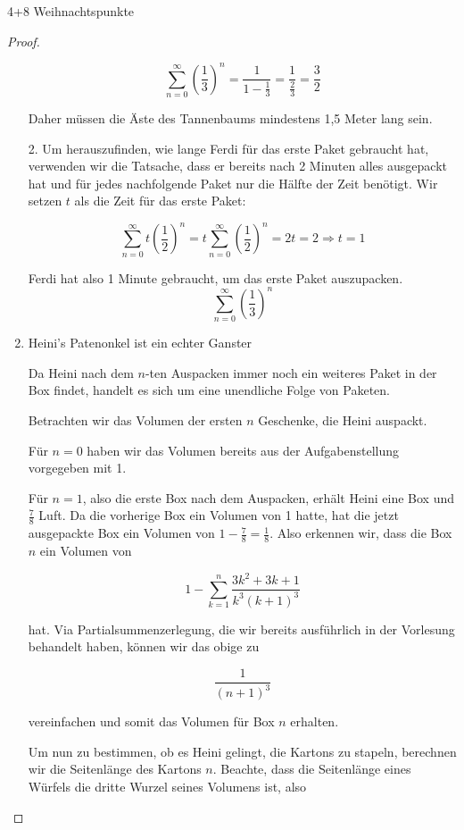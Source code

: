 \documentclass{../problemset}
\begin{document}
\begin{problem}[Weihnachtsaufgaben*]{4+8 Weihnachtspunkte}
\begin{proof}
\begin{enumerate}
		      \[
			      \sum_{n=0}^{\infty} {\left(\frac{1}{3}\right)}^n = \frac{1}{1 - \frac{1}{3}} = \frac{1}{\frac{2}{3}} = \frac{3}{2}
		      \]

		      Daher müssen die Äste des Tannenbaums mindestens 1,5 Meter lang sein.

		      2. Um herauszufinden, wie lange Ferdi für das erste Paket gebraucht hat, verwenden wir die Tatsache, dass er bereits nach 2 Minuten alles ausgepackt hat und für jedes nachfolgende Paket nur die Hälfte der Zeit benötigt.
		      Wir setzen $t$ als die Zeit für das erste Paket:

		      \[
			      \sum_{n=0}^{\infty} t {\left(\frac{1}{2}\right)}^n = t \sum_{n=0}^{\infty} {\left(\frac{1}{2}\right)}^n = 2t = 2 \Rightarrow t = 1
		      \]

		      Ferdi hat also 1 Minute gebraucht, um das erste Paket auszupacken.
		      \[
			      \sum_{n=0}^{\infty} {\left(\frac{1}{3}\right)}^n
		      \]

		\item Heini's Patenonkel ist ein echter Ganster

		      Da Heini nach dem $n$-ten Auspacken immer noch ein weiteres Paket in der Box findet, handelt es sich um eine unendliche Folge von
		      Paketen.

		      Betrachten wir das Volumen der ersten $n$ Geschenke, die Heini auspackt.

		      Für $n = 0$ haben wir das Volumen bereits aus der Aufgabenstellung vorgegeben mit 1.

		      Für $n = 1$, also die erste Box nach dem Auspacken, erhält Heini eine Box und $\frac{7}{8}$ Luft. Da die vorherige Box ein
		      Volumen von 1 hatte, hat die jetzt ausgepackte Box ein Volumen von $1 - \frac{7}{8} = \frac{1}{8}$. Also erkennen wir, dass die
		      Box $n$ ein Volumen von

		      \[
			      1 - \sum_{k=1}^n \frac{3k^2 + 3k + 1}{k^3{(k+1)}^3}
		      \]

		      hat. Via Partialsummenzerlegung, die wir bereits ausführlich in der Vorlesung behandelt haben, können wir das obige zu

		      \[
			      \frac{1}{{(n+1)}^3}
		      \]

		      vereinfachen und somit das Volumen für Box $n$ erhalten.

		      Um nun zu bestimmen, ob es Heini gelingt, die Kartons zu stapeln, berechnen wir die Seitenlänge des Kartons $n$. Beachte, dass
		      die Seitenlänge eines Würfels die dritte Wurzel seines Volumens ist, also


\end{enumerate}
\end{proof}
\end{problem}
\end{document}

